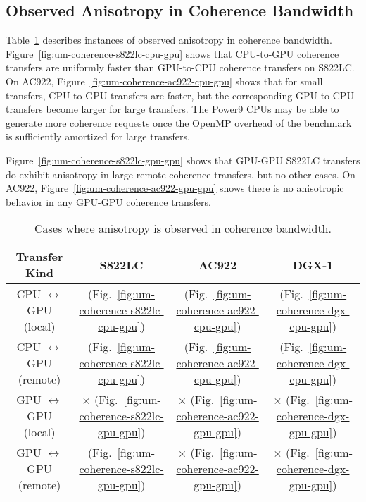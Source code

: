 \subsection{Observed Anisotropy in Coherence Bandwidth}

Table~\ref{tab:um-coherence-anisotropy} describes instances of observed anisotropy in coherence bandwidth.
Figure~\ref{fig:um-coherence-s822lc-cpu-gpu} shows that CPU-to-GPU coherence transfers are uniformly faster than GPU-to-CPU coherence transfers on S822LC.
On AC922, Figure~\ref{fig:um-coherence-ac922-cpu-gpu} shows that for small transfers, CPU-to-GPU transfers are faster, but the corresponding GPU-to-CPU transfers become larger for large transfers.
The Power9 CPUs may be able to generate more coherence requests once the OpenMP overhead of the benchmark is sufficiently amortized for large transfers.

Figure~\ref{fig:um-coherence-s822lc-gpu-gpu} shows that GPU-GPU S822LC transfers do exhibit anisotropy in large remote coherence transfers, but no other cases.
On AC922, Figure~\ref{fig:um-coherence-ac922-gpu-gpu} shows there is no anisotropic behavior in any GPU-GPU coherence transfers.

\begin{table}[ht]
	\centering
	\caption[Anisotropy in Coherence Bandwidth]{
		Cases where anisotropy is observed in coherence bandwidth.
	}
	\label{tab:um-coherence-anisotropy}
	\begin{tabular}{cccc}
		\hline
		\textbf{Transfer Kind}             & \textbf{S822LC}                                         & \textbf{AC922}                                         & \textbf{DGX-1}                            \\ \hline 
		CPU $\leftrightarrow$ GPU (local)  & \checkmark (Fig.~\ref{fig:um-coherence-s822lc-cpu-gpu}) & \checkmark (Fig.~\ref{fig:um-coherence-ac922-cpu-gpu}) & \checkmark (Fig.~\ref{fig:um-coherence-dgx-cpu-gpu}) \\ \hline
		CPU $\leftrightarrow$ GPU (remote) & \checkmark (Fig.~\ref{fig:um-coherence-s822lc-cpu-gpu}) & \checkmark (Fig.~\ref{fig:um-coherence-ac922-cpu-gpu}) & \checkmark (Fig.~\ref{fig:um-coherence-dgx-cpu-gpu}) \\ \hline
		GPU $\leftrightarrow$ GPU (local)  & $\times$   (Fig.~\ref{fig:um-coherence-s822lc-gpu-gpu}) & $\times$   (Fig.~\ref{fig:um-coherence-ac922-gpu-gpu}) & $\times$ (Fig.~\ref{fig:um-coherence-dgx-gpu-gpu}) \\ \hline
		GPU $\leftrightarrow$ GPU (remote) & \checkmark (Fig.~\ref{fig:um-coherence-s822lc-gpu-gpu}) & $\times$   (Fig.~\ref{fig:um-coherence-ac922-gpu-gpu}) & $\times$ (Fig.~\ref{fig:um-coherence-dgx-gpu-gpu}) \\ \hline
	\end{tabular}
\end{table}

